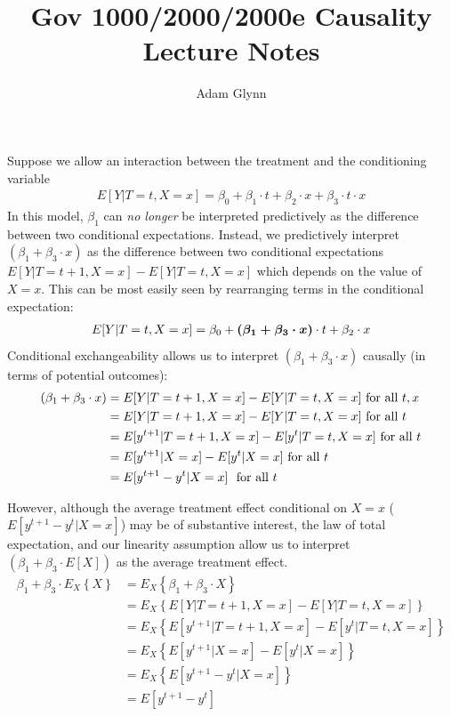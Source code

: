 \documentclass{article}
\title{Gov 1000/2000/2000e Causality Lecture Notes}
\author{Adam Glynn}
\date{}
\begin{document}

\double

Suppose we allow an interaction between the treatment and the conditioning variable
\begin{align*}
E[Y|T=t,X=x] = \beta_0 + \beta_1 \cdot t + \beta_2 \cdot x+ \beta_3 \cdot t \cdot x
\end{align*}
In this model, $\beta_1$ can \emph{no longer} be interpreted predictively as the difference between two conditional expectations. Instead, we predictively interpret $(\beta_1 + \beta_3 \cdot x)$ as the difference between two conditional expectations $E[Y|T=t+1,X=x]-E[Y|T=t,X=x]$ which depends on the value of $X=x$. This can be most easily seen by rearranging terms in the conditional expectation:
\begin{align*}
E[Y|T=t,X=x] = \beta_0 + \boldsymbol{(\beta_1 + \beta_3 \cdot x)} \cdot t + \beta_2 \cdot x
\end{align*}
Conditional exchangeability allows us to interpret $(\beta_1 + \beta_3 \cdot x)$ causally (in terms of potential outcomes): 
\begin{align}
(\beta_1 + \beta_3 \cdot x) &= E[Y|T=t+1,X=x]-E[Y|T=t,X=x] \text{ for all } t,x \notag \\
&= E[Y|T=t+1,X=x]-E[Y|T=t,X=x] \text{ for all } t \notag \\
&= E[y^{t+1}|T=t+1,X=x]-E[y^{t}|T=t,X=x] \text{ for all } t \notag\\
&= E[y^{t+1}|X=x]-E[y^{t}|X=x] \text{ for all } t \notag \\
&= E[y^{t+1}-y^{t}|X=x]\ \text{ for all } t \label{eq:condeff}
\end{align}

However, although the average treatment effect conditional on $X=x$ ($E[y^{t+1}-y^{t}|X=x]$) may be of substantive interest,  the law of total expectation, and our linearity assumption allow us to interpret $(\beta_1 + \beta_3 \cdot E[X])$ as the average treatment effect. 
\begin{align*}
\beta_1 + \beta_3 \cdot E_X\left\{X \right\} &= E_X\left\{\beta_1 + \beta_3 \cdot X \right\} \\
&= E_X\left\{E[Y|T=t+1,X=x]-E[Y|T=t,X=x]\right\}\\
&= E_X\left\{E[y^{t+1}|T=t+1,X=x]-E[y^{t}|T=t,X=x]\right\} \\
&= E_X\left\{E[y^{t+1}|X=x]-E[y^{t}|X=x]\right\}\\
&= E_X\left\{E[y^{t+1}-y^{t}|X=x]\right\} \\
&= E[y^{t+1}-y^{t}] 
\end{align*}
\end{document}
